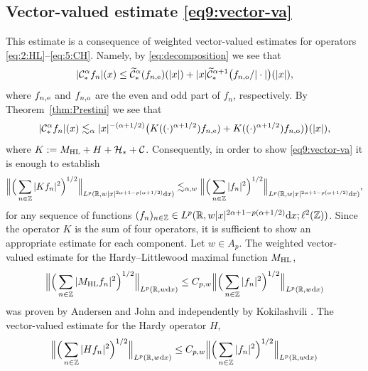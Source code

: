 \documentclass[11pt,oneside]{amsart}
\numberwithin{equation}{section}
\theoremstyle{definition}
\newcommand{\RR}{\mathbb{R}}
\newcommand{\ZZ}{\mathbb{Z}}
\newcommand{\calC}{\mathcal{C}}
\newcommand{\calH}{\mathcal{H}}
\begin{document}
\subsection{Vector-valued estimate \eqref{eq9:vector-va}}
This estimate is a consequence of weighted vector-valued estimates for operators \eqref{eq:2:HL}--\eqref{eq:5:CH}. Namely, by \eqref{eq:decomposition} we see that
\begin{equation*}
   |\calC_{\ast}^\alpha f_n|(x)\leq \widetilde{\calC}_{\ast}^\alpha(f_{n,{\rm e}})(|x|)+|x|\widetilde{\calC}_{\ast}^{\alpha+1}\big(f_{n,{\rm o}}/{|\cdot|}\big)(|x|),
\end{equation*}
where $f_{n,{\rm e}}$ and $f_{n,{\rm o}}$ are the even and odd part of $f_n$, respectively. By Theorem~\ref{thm:Prestini} we see that
\begin{equation*}
    |\calC_{\ast}^\alpha f_n|(x)\lesssim_\alpha|x|^{-(\alpha+1/2)}\big(K((\cdot)^{\alpha+1/2})f_{n,{\rm e}})+K((\cdot)^{\alpha+1/2})f_{n,{\rm o}})\big)(|x|),
\end{equation*}
where $K:=M_{\rm HL}+H+\calH_\ast+\calC$. Consequently, in order to show \eqref{eq9:vector-va} it is enough to establish
\begin{equation}\label{eq10:vector-va}
\Big\|\Big(\sum_{n\in\ZZ}|Kf_n|^2\Big)^{1/2}\Big\|_{L^p(\RR,w|x|^{2\alpha+1-p(\alpha+1/2)}{\rm d}x)}\lesssim_{\alpha,w}\Big\|\Big(\sum_{n\in\ZZ}|f_n|^2\Big)^{1/2}\Big\|_{L^p(\RR,w|x|^{2\alpha+1-p(\alpha+1/2)}{\rm d}x)},
\end{equation}
for any sequence of functions $(f_n)_{n\in\ZZ}\in{L^p(\RR,w|x|^{2\alpha+1-p(\alpha+1/2)}{\rm d}x;\ell^2(\ZZ))}$. Since the operator $K$ is the sum of four operators, it is sufficient to show an appropriate estimate for each component. Let $w\in A_p$. The weighted vector-valued estimate for the Hardy--Littlewood maximal function $M_{\rm HL}$, 
\begin{equation*}
    \Big\|\Big(\sum_{n\in\ZZ}|M_{\rm HL}f_n|^2\Big)^{1/2}\Big\|_{L^p(\RR,w{\rm d}x)}\leq C_{p,w}\Big\|\Big(\sum_{n\in\ZZ}|f_n|^2\Big)^{1/2}\Big\|_{L^p(\RR,w{\rm d}x)}
\end{equation*}
was proven by Andersen and John \cite[Theorem 3.1]{AndersenJohn80} and independently by Kokilashvili \cite{Kokilasvili}. The vector-valued estimate for the Hardy operator $H$,
\begin{equation*}
\Big\|\Big(\sum_{n\in\ZZ}|Hf_n|^2\Big)^{1/2}\Big\|_{L^p(\RR,w{\rm d}x)}\leq C_{p,w}\Big\|\Big(\sum_{n\in\ZZ}|f_n|^2\Big)^{1/2}\Big\|_{L^p(\RR,w{\rm d}x)}
\end{equation*}
\end{document}
